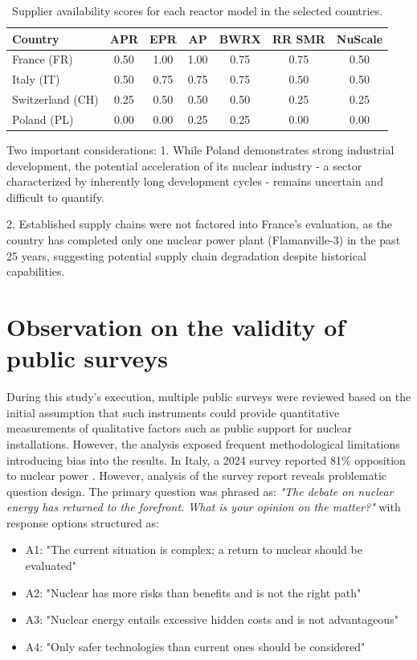 \begin{table}[!ht]
    \centering
    \begin{tabularx}{\textwidth}{l c c c c c c}
        \toprule
        \textbf{Country} & \textbf{APR} & \textbf{EPR} & \textbf{AP} & \textbf{BWRX} & \textbf{RR SMR} & \textbf{NuScale} \\
        \midrule
        France (FR)       & 0.50 & 1.00 & 1.00 & 0.75 & 0.75 & 0.50 \\
        Italy (IT)       & 0.50 & 0.75 & 0.75 & 0.75 & 0.50 & 0.50 \\
        Switzerland (CH)  & 0.25 & 0.50 & 0.50 & 0.50 & 0.25 & 0.25 \\
        Poland (PL)       & 0.00 & 0.00 & 0.25 & 0.25 & 0.00 & 0.00 \\
        \bottomrule
    \end{tabularx}
    \caption{Supplier availability scores for each reactor model in the selected countries.}
    \label{tab:supplier-availability-step2}
\end{table}

Two important considerations:
1. While Poland demonstrates strong industrial development, the potential acceleration of its nuclear industry - a sector characterized by inherently long development cycles - remains uncertain and difficult to quantify.

2. Established supply chains were not factored into France's evaluation, as the country has completed only one nuclear power plant (Flamanville-3) in the past 25 years, suggesting potential supply chain degradation despite historical capabilities.



\section{Observation on the validity of public surveys}
During this study's execution, multiple public surveys were reviewed based on the initial assumption that such instruments could provide quantitative measurements of qualitative factors such as public support for nuclear installations. However, the analysis exposed frequent methodological limitations introducing bias into the results. In Italy, a 2024 survey reported 81\% opposition to nuclear power \cite{IPSOS_Nuclear_Survey_2024}. However, analysis of the survey report reveals problematic question design. The primary question was phrased as: \textit{"The debate on nuclear energy has returned to the forefront. What is your opinion on the matter?"} with response options structured as:
\begin{itemize}
    \item A1: "The current situation is complex; a return to nuclear should be evaluated"
    \item A2: "Nuclear has more risks than benefits and is not the right path"
    \item A3: "Nuclear energy entails excessive hidden costs and is not advantageous"
    \item A4: "Only safer technologies than current ones should be considered"
\end{itemize}


